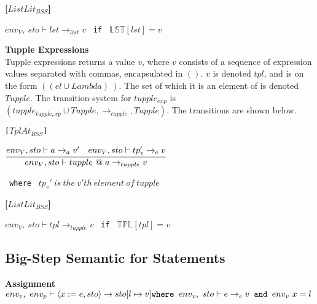 \textbf{[$ListLit_{BSS}$]}\\
\begin{center}
	\begin{math}
	env_V,\ sto \vdash lst \rightarrow_{list} v
	\end{math}
	\texttt{ if } $\mathbb{LST}[lst] = v$
\end{center}

\textbf{\Large{Tupple Expressions}}\\
Tupple expressions returns a value $v$, where $v$ consists of a sequence of expression values separated with commas, encapsulated in $()$.
$v$ is denoted $tpl$, and is on the form $((el \cup Lambda)~)$.
The set of which it is an element of is denoted $Tupple$.
The transition-system for $tupple_{exp}$ is $(tupple_{tupple_exp} \cup Tupple, \rightarrow_{tupple}, Tupple)$.
The transitions are shown below.

\texttt{[$TplAt_{BSS}$]}\\
\begin{center}
	\begin{math}
	\cfrac
	{env_V, sto \vdash a \rightarrow_{a} v' \quad env_V, sto \vdash tp_v' \rightarrow_e v}
	{env_V, sto \vdash tupple\ @\ a \rightarrow_{tupple} v}
	\end{math}
	
	\texttt{ where } $tp_v'\ is\ the\ v'th\ element\ of\ tupple$
\end{center}

\textbf{[$ListLit_{BSS}$]}\\
\begin{center}
	\begin{math}
	env_V,\ sto \vdash tpl \rightarrow_{tupple} v
	\end{math}
	\texttt{ if } $\mathbb{TPL}[tpl] = v$
\end{center}












\subsection{Big-Step Semantic for Statements}
\textbf{Assignment}\\
\begin{math}
	env_v,\ env_p \vdash \langle x := e, sto \rangle \rightarrow sto[l \mapsto v]\\
	\texttt{where } env_v,\ sto \vdash e \rightarrow_e v
	\texttt{ and } env_v\ x = l
\end{math}

